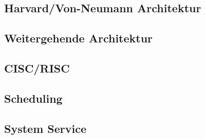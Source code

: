 \subsection{Harvard/Von-Neumann Architektur}\label{2.3}
\subsection{Weitergehende Architektur}\label{2.4}
\subsection{CISC/RISC}\label{2.5}
\subsection{Scheduling}\label{2.6}
\subsection{System Service}\label{2.7}